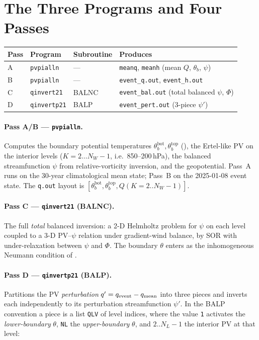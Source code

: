 \section{The Three Programs and Four Passes}
\label{sec:wu_passes}

\begin{center}\small
\begin{tabular}{llll}
  \toprule
  Pass & Program & Subroutine & Produces \\
  \midrule
  A & \texttt{pvpialln}  & ---    & \texttt{meanq}, \texttt{meanh} (mean $Q$, $\theta_b$, $\psi$) \\
  B & \texttt{pvpialln}  & ---    & \texttt{event\_q.out}, \texttt{event\_h.out} \\
  C & \texttt{qinvert21} & BALNC  & \texttt{event\_bal.out} (total balanced $\psi$, $\Phi$) \\
  D & \texttt{qinvertp21}& BALP   & \texttt{event\_pert.out} (3-piece $\psi'$) \\
  \bottomrule
\end{tabular}
\end{center}

\paragraph{Pass A/B --- \texttt{pvpialln}.}  Computes the boundary
potential temperatures $\theta_b^{\text{bot}},\theta_b^{\text{top}}$
(), the Ertel-like PV on the interior levels
($K=2\ldots N_W{-}1$, i.e.\ 850--200\,hPa), the balanced streamfunction
$\psi$ from relative-vorticity inversion, and the geopotential.  Pass~A
runs on the 30-year climatological mean state; Pass~B on the
2025-01-08 event state.  The \texttt{q.out} layout is
$[\theta_b^{\text{bot}},\theta_b^{\text{top}},Q(K{=}2..N_W{-}1)]$.

\paragraph{Pass C --- \texttt{qinvert21} (BALNC).}  The full
\emph{total} balanced inversion: a 2-D Helmholtz problem for $\psi$ on
each level coupled to a 3-D PV--$\psi$ relation under gradient-wind
balance, by SOR with under-relaxation between $\psi$ and $\Phi$.  The
boundary $\theta$ enters as the inhomogeneous Neumann condition of
.

\paragraph{Pass D --- \texttt{qinvertp21} (BALP).}  Partitions the PV
\emph{perturbation} $q^{\prime}=q_{\text{event}}-q_{\text{mean}}$ into three
pieces and inverts each independently to its perturbation streamfunction
$\psi'$.  In the BALP convention a piece is a list \texttt{QLV} of level
indices, where the value \texttt{1} activates the \emph{lower-boundary}
$\theta$, \texttt{NL} the \emph{upper-boundary} $\theta$, and
$2..N_L{-}1$ the interior PV at that level:

